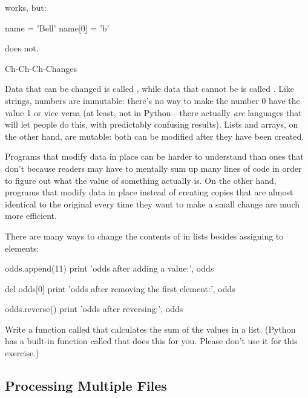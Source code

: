 works, but:

\begin{VerbIn}
name = 'Bell'
name[0] = 'b'
\end{VerbIn}

does not.

\begin{swcbox}{Ch-Ch-Ch-Changes}

Data that can be changed is called , while
data that cannot be is called . Like
strings, numbers are immutable: there's no way to make the number 0 have
the value 1 or vice versa (at least, not in Python---there actually
\emph{are} languages that will let people do this, with predictably
confusing results). Lists and arrays, on the other hand, are mutable:
both can be modified after they have been created.

Programs that modify data in place can be harder to understand than ones
that don't because readers may have to mentally sum up many lines of
code in order to figure out what the value of something actually is. On
the other hand, programs that modify data in place instead of creating
copies that are almost identical to the original every time they want to
make a small change are much more efficient.

\end{swcbox}

There are many ways to change the contents of in lists besides assigning
to elements:

\begin{VerbIn}
odds.append(11)
print 'odds after adding a value:', odds
\end{VerbIn}

\begin{VerbIn}
del odds[0]
print 'odds after removing the first element:', odds
\end{VerbIn}

\begin{VerbIn}
odds.reverse()
print 'odds after reversing:', odds
\end{VerbIn}

\begin{challenge}
  Write a function called  that calculates the sum of the
  values in a list. (Python has a built-in function called 
  that does this for you. Please don't use it for this exercise.)
\end{challenge}

\subsection{Processing Multiple Files}

